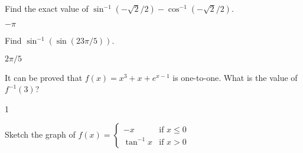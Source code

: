 \begin{enumialphparenastyle}
\begin{ex}
Find the exact value of $\sin^{-1}\left(-\sqrt{2}/2\right)-\cos^{-1}\left(-\sqrt{2}/2\right)$.
\begin{sol}
	$-\pi$
\end{sol}
\end{ex}


\begin{ex}
Find $\sin^{-1}\left(\sin(23\pi/5)\right)$.
\begin{sol}
	$2\pi/5$
\end{sol}
\end{ex}


\begin{ex}
It can be proved that $f(x)=x^3+x+e^{x-1}$ is one-to-one. What is the value of $f^{-1}(3)$?
\begin{sol}
	1
\end{sol}
\end{ex}


\begin{ex}
Sketch the graph of $f(x)=\left\{ 
\begin{array}{cc}
-x & \text{if }x\leq 0 \\ 
\tan ^{-1}x & \text{if }x>0%
\end{array}%
\right. $
\end{ex}


\end{enumialphparenastyle}
